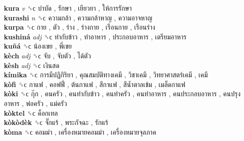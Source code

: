 \textbf{kura} \emph{v}  ␝ϲ   บำบัด ,  รักษา ,  เยียวยา ,  ให้การรักษา   \\
\textbf{kurashi} \emph{n}  ␝ϲ   ความกล้า ,  ความกล้าหาญ ,  ความอาจหาญ   \\
\textbf{kurpa} ␝ϲ   กาย ,  ตัว ,  ร่าง ,  ร่างกาย ,  เรือนกาย ,  เรือนร่าง   \\
\textbf{kushiná} \emph{adj}  ␝ϲ   ทำกับข้าว ,  ทำอาหาร ,  ประกอบอาหาร ,  เตรียมอาหาร   \\
\textbf{kuñá} ␝ϲ   น้องเขย ,  พี่เขย   \\
\textbf{kèch} \emph{adj}  ␝ϲ   จับ ,  จับตัว ,  ได้ตัว   \\
\textbf{kèsh} \emph{adj}  ␝ϲ   เงินสด   \\
\textbf{kímika} ␝ϲ   การมีปฏิกิริยา ,  คุณสมบัติทางเคมี ,  วิชาเคมี ,  วิทยาศาสตร์เคมี ,  เคมี   \\
\textbf{kòfi} ␝ϲ   กาแฟ ,  คอฟฟี่ ,  ต้นกาแฟ ,  สีกาแฟ ,  สีน้ำตาลเข้ม ,  เมล็ดกาแฟ   \\
\textbf{kòki} ␝ϲ   กุ๊ก ,  คนครัว ,  คนทำกับข้าว ,  คนทำครัว ,  คนทำอาหาร ,  คนประกอบอาหาร ,  คนปรุงอาหาร ,  พ่อครัว ,  แม่ครัว   \\
\textbf{kòktel} ␝ϲ   ค็อกเทล   \\
\textbf{kòkòdèk} ␝ϲ   จั๊กแร้ ,  พระกัจฉะ ,  รักแร้   \\
\textbf{kòma} ␝ϲ   คอมม่า ,  เครื่องหมายคอมม่า ,  เครื่องหมายจุลภาค   \\
